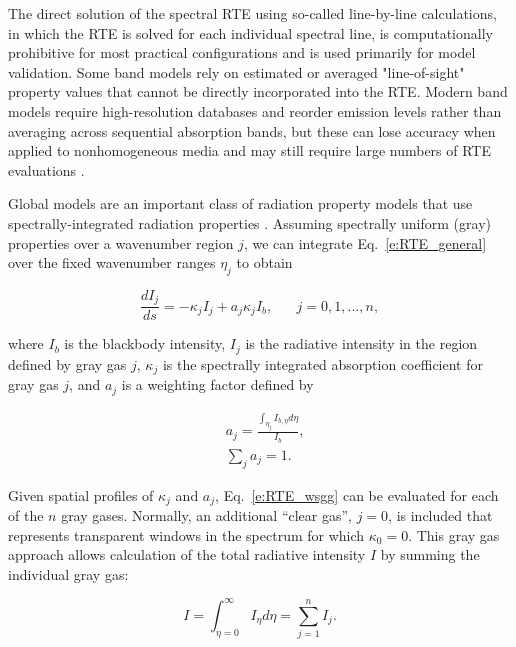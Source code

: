 \documentclass[preprint,12pt]{elsarticle}
\newcounter{bla}
\begin{document}
    The direct solution of the spectral RTE using so-called line-by-line calculations, in which the RTE is solved for
    each
    individual spectral line, is computationally prohibitive for most practical configurations and is used primarily
    for model
    validation. Some band models rely on estimated or averaged "line-of-sight" property values that cannot be directly
    incorporated into the RTE. Modern band models require high-resolution databases and reorder emission levels rather than averaging across sequential
    absorption bands, but these can lose accuracy when applied to nonhomogeneous media and may still require large numbers of
    RTE evaluations \citep{Modest_2016}.

    Global models are an important class of radiation property models that use spectrally-integrated radiation properties \cite{Hottel_1967,Modest_2013,Modest_2016}. Assuming spectrally uniform (gray) properties over a wavenumber region $j$, we can integrate Eq.~\ref{e:RTE_general} over the fixed wavenumber ranges $\eta_j$ to obtain
%
    \begin{linenomath}
        \begin{equation}
            \label{e:RTE_wsgg}
            \frac{dI_j}{ds} = -\kappa_jI_j + a_j\kappa_jI_b, \hspace{20pt} j=0,1,...,n,
        \end{equation}
    \end{linenomath}
%
    where $I_b$ is the blackbody intensity, $I_j$ is the radiative intensity in the region defined by gray gas $j$, $\kappa_j$ is the spectrally integrated absorption coefficient for gray gas $j$, and $a_j$ is a weighting factor defined by
%
    \begin{linenomath}
        \begin{align}
            &a_j= \frac{\int_{\eta_j}I_{b,\eta}d\eta}{I_b},\\
            &\sum_j a_j = 1.
        \end{align}
    \end{linenomath}
%
    Given spatial profiles of $\kappa_j$ and $a_j$, Eq.~\ref{e:RTE_wsgg} can be evaluated for each of the $n$ gray gases. Normally, an additional ``clear gas'', $j=0$, is included that represents transparent windows in the spectrum for which $\kappa_0=0$. This gray gas approach allows calculation of the total radiative intensity $I$ by summing the individual gray gas:
%
    \begin{linenomath}
        \begin{equation}
            I=\int_{\eta=0}^{\infty}I_{\eta}d\eta=\sum_{j=1}^n I_j.
        \end{equation}
    \end{linenomath}
%
\end{document}
